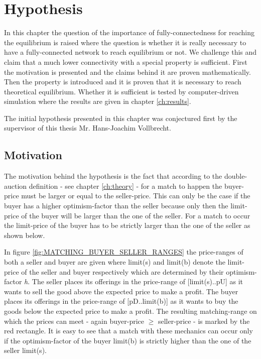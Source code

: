 \documentclass[Bachelorarbeit.tex]{subfiles}
\begin{document}
\graphicspath{{./figures/hypothesis/}}	%

\chapter{Hypothesis}
\label{ch:hypothesis}

In this chapter the question of the importance of fully-connectedness for reaching the equilibrium is raised where the question is whether it is really necessary to have a fully-connected network to reach equilibrium or not. We challenge this and claim that a much lower connectivity with a special property is sufficient. First the motivation is presented and the claims behind it are proven mathematically. Then the property is introduced and it is proven that it is necessary to reach theoretical equilibrium. Whether it is sufficient is tested by computer-driven simulation where the results are given in chapter \ref{ch:results}.

\medskip

The initial hypothesis presented in this chapter was conjectured first by the supervisor of this thesis Mr. Hans-Joachim Vollbrecht.

\section{Motivation}
The motivation behind the hypothesis is the fact that according to the double-auction definition - see chapter \ref{ch:theory} - for a match to happen the buyer-price must be larger or equal to the seller-price. This can only be the case if the buyer has a higher optimism-factor than the seller because only then the limit-price of the buyer will be larger than the one of the seller. For a match to occur the limit-price of the buyer has to be strictly larger than the one of the seller as shown below.

\medskip

In figure \ref{fig:MATCHING_BUYER_SELLER_RANGES} the price-ranges of both a seller and buyer are given where limit(s) and limit(b) denote the limit-price of the seller and buyer respectively which are determined by their optimism-factor \textit{h}. The seller places its offerings in the price-range of [limit(s)..pU] as it wants to sell the good above the expected price to make a profit. The buyer places its offerings in the price-range of [pD..limit(b)] as it wants to buy the goods below the expected price to make a profit. The resulting matching-range on which the prices can meet - again buyer-price $\geq$ seller-price - is marked by the red rectangle. It is easy to see that a match with these mechanics can occur only if the optimism-factor of the buyer limit(b) is strictly higher than the one of the seller limit(s).
\end{document}

